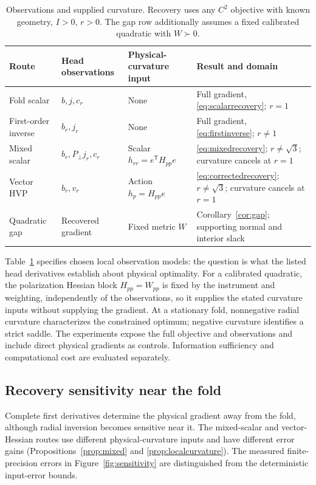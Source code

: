 \documentclass[pdflatex,sn-mathphys-num]{sn-jnl}
\begin{document}
\begin{table}[!t]
\caption{Observations and supplied curvature. Recovery uses any $C^2$ objective with known geometry, $I>0$, $r>0$. The gap row additionally assumes a fixed calibrated quadratic with $W\succ0$.}
\label{tab:contract}
\centering\small\renewcommand{\arraystretch}{1.13}
\begin{tabularx}{\textwidth}{@{}p{}p{}p{}X@{}}\toprule
Route & Head observations & Physical-curvature input & Result and domain\\\midrule
Fold scalar & $b,j,c_r$ & None & Full gradient, \eqref{eq:scalarrecovery}; $r=1$\\
First-order inverse & $b_r,j_r$ & None & Full gradient, \eqref{eq:firstinverse}; $r\ne1$\\
Mixed scalar & $b_r,P_\perp j_r,c_r$ & Scalar $h_{rr}=e^{\mathsf T}H_{pp}e$ & \eqref{eq:mixedrecovery}; $r\ne\sqrt3$; curvature cancels at $r=1$\\
Vector HVP & $b_r,v_r$ & Action $h_p=H_{pp}e$ & \eqref{eq:correctedrecovery}; $r\ne\sqrt3$; curvature cancels at $r=1$\\
Quadratic gap & Recovered gradient & Fixed metric $W$ & Corollary~\ref{cor:gap}; supporting normal and interior slack\\\bottomrule
\end{tabularx}
\end{table}

Table~\ref{tab:contract} specifies chosen local observation models: the question is what the listed head derivatives establish about physical optimality. For a calibrated quadratic, the polarization Hessian block $H_{pp}=W_{pp}$ is fixed by the instrument and weighting, independently of the observations, so it supplies the stated curvature inputs without supplying the gradient. At a stationary fold, nonnegative radial curvature characterizes the constrained optimum; negative curvature identifies a strict saddle. The experiments expose the full objective and observations and include direct physical gradients as controls. Information sufficiency and computational cost are evaluated separately.

\subsection{Recovery sensitivity near the fold}
Complete first derivatives determine the physical gradient away from the fold, although radial inversion becomes sensitive near it. The mixed-scalar and vector-Hessian routes use different physical-curvature inputs and have different error gains (Propositions~\ref{prop:mixed} and \ref{prop:localcurvature}). The measured finite-precision errors in Figure~\ref{fig:sensitivity} are distinguished from the deterministic input-error bounds.
\end{document}

